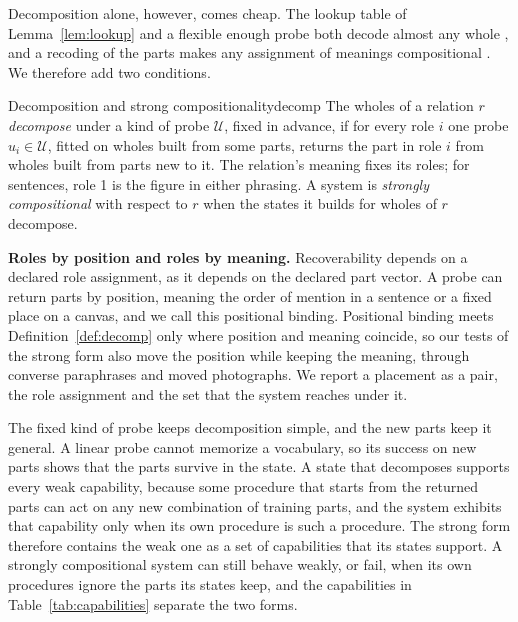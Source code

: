 \documentclass[10pt]{article}
\theoremstyle{plain}
\theoremstyle{remark}
\newcommand{\U}{\mathcal{U}}
\begin{document}
Decomposition alone, however, comes cheap. The lookup table of Lemma~\ref{lem:lookup} and a flexible enough probe both decode almost any whole \citep{hewitt2019}, and a recoding of the parts makes any assignment of meanings compositional \citep{zadrozny1994}. We therefore add two conditions.

\begin{defbox}{Decomposition and strong compositionality}{decomp}
The wholes of a relation $r$ \emph{decompose} under a kind of probe $\U$, fixed in advance, if for every role $i$ one probe $u_i \in \U$, fitted on wholes built from some parts, returns the part in role $i$ from wholes built from parts new to it. The relation's meaning fixes its roles; for sentences, role 1 is the figure in either phrasing. A system is \emph{strongly compositional} with respect to $r$ when the states it builds for wholes of $r$ decompose.
\end{defbox}

\textbf{Roles by position and roles by meaning.} Recoverability depends on a declared role assignment, as it depends on the declared part vector. A probe can return parts by position, meaning the order of mention in a sentence or a fixed place on a canvas, and we call this positional binding. Positional binding meets Definition~\ref{def:decomp} only where position and meaning coincide, so our tests of the strong form also move the position while keeping the meaning, through converse paraphrases and moved photographs. We report a placement as a pair, the role assignment and the set that the system reaches under it.

The fixed kind of probe keeps decomposition simple, and the new parts keep it general. A linear probe cannot memorize a vocabulary, so its success on new parts shows that the parts survive in the state. A state that decomposes supports every weak capability, because some procedure that starts from the returned parts can act on any new combination of training parts, and the system exhibits that capability only when its own procedure is such a procedure. The strong form therefore contains the weak one as a set of capabilities that its states support. A strongly compositional system can still behave weakly, or fail, when its own procedures ignore the parts its states keep, and the capabilities in Table~\ref{tab:capabilities} separate the two forms.
\end{document}
